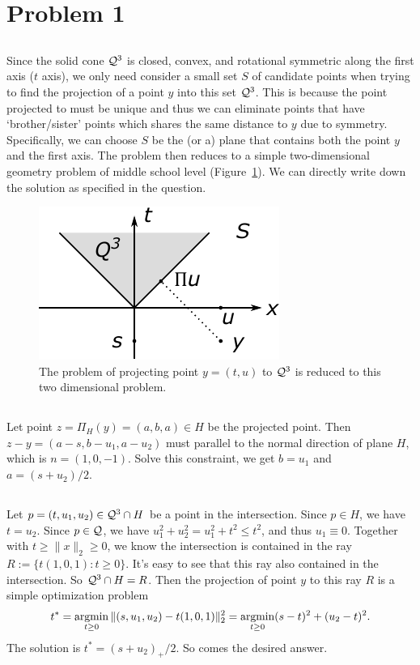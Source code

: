 \section{Problem 1}

\subsection{} %

Since the solid cone $\mathcal{Q}^3$ is closed, convex,
and rotational symmetric along the first axis ($t$ axis),
we only need consider a small set $S$ of candidate points
when trying to find the projection of a point $y$ into this set $\mathcal{Q}^3$.
This is because the point projected to must be unique
and thus we can eliminate points that have `brother/sister' points which
shares the same distance to $y$ due to symmetry.
Specifically, we can choose $S$ be the (or a) plane that contains
both the point $y$ and the first axis.
The problem then reduces to a simple two-dimensional geometry problem
of middle school level (Figure~\ref{fig:1}).
We can directly write down the solution as specified in the question.

\begin{figure}[ht]
\centering
    \includegraphics[width=0.36\linewidth]{figure/fig1}
    \caption{\small
    The problem of projecting point $y=(t,u)$ to $\mathcal{Q}^3$ is
    reduced to this two dimensional problem.}
    \label{fig:1}
\end{figure}

\subsection{} %

Let point $z=\Pi_H(y)=(a,b,a)\in H$ be the projected point.
Then $z-y=(a-s, b-u_1, a-u_2)$ must parallel to the normal direction of plane $H$,
which is $n=(1,0,-1)$.
Solve this constraint,
we get $b=u_1$ and $a=(s+u_2)/2$.

\subsection{} %

Let $p=(t,u_1,u_2)\in \mathcal{Q}^3\cap H$ be a point in the intersection.
Since $p\in H$, we have $t=u_2$.
Since $p \in \mathcal{Q}$, we have $u_1^2+u_2^2=u_1^2 + t^2\le t^2$,
and thus $u_1\equiv0$.
Together with $t\ge\|x\|_2\ge0$,
we know the intersection is contained in the ray $R:=\{t(1,0,1): t\ge0\}$.
It's easy to see that this ray also contained in the intersection.
So $\mathcal{Q}^3\cap H=R$.
Then the projection of point $y$ to this ray $R$ is a simple optimization problem
\begin{equation}
    t^*=\mathop{\mathrm{argmin}}_{t\ge0}\|(s,u_1,u_2)-t(1,0,1)\|_2^2=\mathop{\mathrm{argmin}}_{t\ge0}(s-t)^2+(u_2-t)^2.
\end{equation}
The solution is $t^*=(s+u_2)_+/2$.
So comes the desired answer.

\subsection{} %
